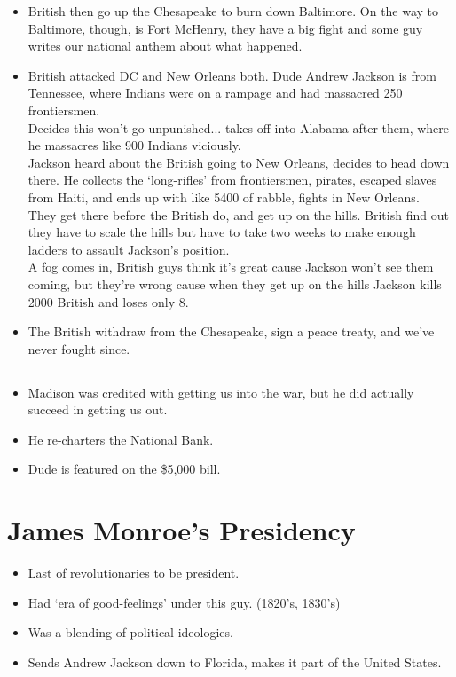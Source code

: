 \documentclass{article}
\begin{document}
\begin{itemize}
        \item British then go up the Chesapeake to burn down Baltimore. On the way to Baltimore, though, is Fort McHenry, they have a big fight and some guy writes our national anthem about what happened.
        \item British attacked DC and New Orleans both. Dude Andrew Jackson is from Tennessee, where Indians were on a rampage and had massacred 250 frontiersmen. \\ 
        Decides this won't go unpunished... takes off into Alabama after them, where he massacres like 900 Indians viciously. \\
        Jackson heard about the British going to New Orleans, decides to head down there. He collects the `long-rifles' from frontiersmen, pirates, escaped slaves from Haiti, and ends up with like 5400 of rabble, fights in New Orleans. \\
        They get there before the British do, and get up on the hills. British find out they have to scale the hills but have to take two weeks to make enough ladders to assault Jackson's position. \\
        A fog comes in, British guys think it's great cause Jackson won't see them coming, but they're wrong cause when they get up on the hills Jackson kills 2000 British and loses only 8.
        \item The British withdraw from the Chesapeake, sign a peace treaty, and we've never fought since.
      \end{itemize}

    \subsection*{}
      \begin{itemize}
        \item Madison was credited with getting us into the war, but he did actually succeed in getting us out.
        \item He re-charters the National Bank.
        \item Dude is featured on the \$5,000 bill. 
      \end{itemize}

  \section{James Monroe's Presidency}
    \begin{itemize}
      \item Last of revolutionaries to be president.
      \item Had `era of good-feelings' under this guy. (1820's, 1830's)
      \item Was a blending of political ideologies. 
      \item Sends Andrew Jackson down to Florida, makes it part of the United States.
    \end{itemize}
\end{document}
